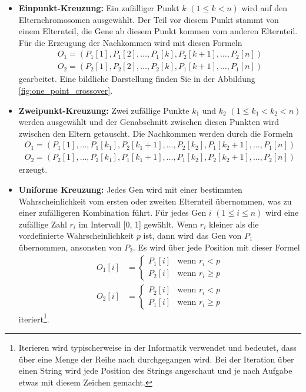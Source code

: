 \begin{itemize}
	\item \textbf{Einpunkt-Kreuzung:} Ein zufälliger Punkt \( k \) \((1 \leq k < n)\)
	wird auf den Elternchromosomen ausgewählt. Der Teil vor diesem Punkt stammt
	von einem Elternteil, die Gene ab diesem Punkt kommen vom anderen Elternteil. 
	Für die Erzeugung der Nachkommen wird mit diesen Formeln
	\begin{align*}
		O_1 = (P_1[1], P_1[2], \ldots, P_1[k], P_2[k+1], \ldots, P_2[n])\\
		O_2 = (P_2[1], P_2[2], \ldots, P_2[k], P_1[k+1], \ldots, P_1[n])
	\end{align*}
	gearbeitet. Eine bildliche Darstellung finden Sie in der Abbildung 
	\ref{fig:one_point_crossover}.
	\item \textbf{Zweipunkt-Kreuzung:} Zwei zufällige Punkte \( k_1 \) und \( k_2 \)
	\((1 \leq k_1 < k_2 < n)\) werden ausgewählt und
	der Genabschnitt zwischen diesen Punkten wird zwischen den Eltern 
	getauscht. Die Nachkommen werden durch die Formeln
	\begin{align*}
		O_1 = (P_1[1], \ldots, P_1[k_1], P_2[k_1+1], \ldots, P_2[k_2], P_1[k_2+1], \ldots, P_1[n])\\
		O_2 = (P_2[1], \ldots, P_2[k_1], P_1[k_1+1], \ldots, P_1[k_2], P_2[k_2+1], \ldots, P_2[n])
	\end{align*}
	erzeugt.
	\item \textbf{Uniforme Kreuzung:} Jedes Gen wird mit einer bestimmten
	Wahrscheinlichkeit vom ersten oder zweiten Elternteil übernommen, was zu
	einer zufälligeren Kombination führt. Für jedes Gen \( i \) \((1 \leq i \leq n)\)
	wird eine zufällige Zahl \( r_i \) im Intervall [0, 1] gewählt. Wenn
	\( r_i \) kleiner als die vordefinierte Wahrscheinlichkeit \( p \) ist,
	dann wird das Gen von \( P_1 \) übernommen, ansonsten von \( P_2 \). Es
	wird über jede Position mit dieser Formel 
	\begin{align*}
		O_1[i] &=
		\begin{cases} 
			P_1[i] & \text{wenn } r_i < p       \\
			P_2[i] & \text{wenn } r_i \geq p 
		\end{cases}
		\\
		O_2[i] &=
		\begin{cases} 
			P_2[i] & \text{wenn } r_i < p       \\
			P_1[i] & \text{wenn } r_i \geq p 
		\end{cases}
	\end{align*}
	iteriert\footnote{
		Iterieren wird typischerweise in der Informatik verwendet und 
		bedeutet, dass über eine Menge der Reihe nach durchgegangen wird. 
		Bei der Iteration über einen String wird jede Position des Strings 
		angeschaut und je nach Aufgabe etwas mit diesem Zeichen gemacht.
		}.
\end{itemize}

